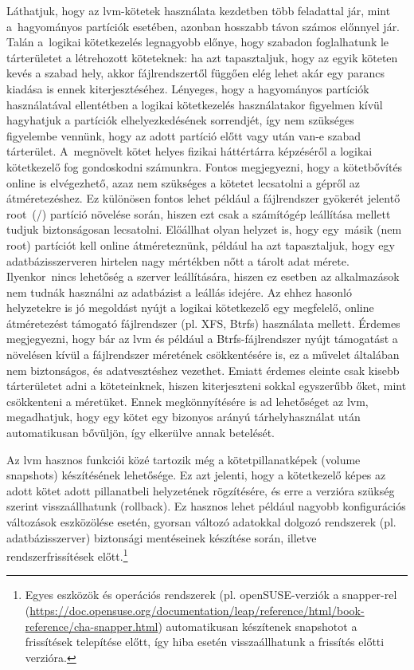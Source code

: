 Láthatjuk, hogy az \acrshort{lvm}-kötetek használata kezdetben több feladattal jár, mint a~hagyományos partíciók esetében, azonban hosszabb távon számos előnnyel jár. Talán a~logikai kötetkezelés legnagyobb előnye, hogy szabadon foglalhatunk le tárterületet a létrehozott köteteknek: ha azt tapasztaljuk, hogy az egyik köteten kevés a szabad hely, akkor fájlrendszertől függően elég lehet akár egy parancs kiadása is ennek kiterjesztéséhez. Lényeges, hogy a hagyományos partíciók használatával ellentétben a logikai kötetkezelés használatakor figyelmen kívül hagyhatjuk a partíciók elhelyezkedésének sorrendjét, így nem szükséges figyelembe vennünk, hogy az adott partíció előtt vagy után van-e szabad tárterület. A~megnövelt kötet helyes fizikai háttértárra képzéséről a logikai kötetkezelő fog gondoskodni számunkra. Fontos megjegyezni, hogy a kötetbővítés online is elvégezhető, azaz nem szükséges a kötetet lecsatolni a gépről az átméretezéshez. Ez különösen fontos lehet például a fájlrendszer gyökerét jelentő root~(/) partíció növelése során, hiszen ezt csak a számítógép leállítása mellett tudjuk biztonságosan lecsatolni. Előállhat olyan helyzet is, hogy egy~másik (nem root) partíciót kell online átméreteznünk, például ha azt tapasztaljuk, hogy egy adatbázisszerveren hirtelen nagy mértékben nőtt a tárolt adat mérete. Ilyenkor~nincs lehetőség a szerver leállítására, hiszen ez esetben az alkalmazások nem tudnák használni az adatbázist a leállás idejére. Az ehhez hasonló helyzetekre is jó megoldást nyújt a logikai kötetkezelő egy megfelelő, online átméretezést támogató fájlrendszer (pl. XFS, Btrfs) használata mellett. Érdemes megjegyezni, hogy bár az \acrshort{lvm} és például a Btrfs-fájlrendszer nyújt támogatást a növelésen kívül a fájlrendszer méretének csökkentésére is, ez a művelet általában nem biztonságos, és adatvesztéshez vezethet. Emiatt érdemes eleinte csak kisebb tárterületet adni a köteteinknek, hiszen kiterjeszteni sokkal egyszerűbb őket, mint csökkenteni a méretüket. Ennek megkönnyítésére is ad lehetőséget az \acrshort{lvm}, megadhatjuk, hogy egy kötet egy bizonyos arányú tárhelyhasználat után automatikusan bővüljön, így elkerülve annak betelését.

Az \acrshort{lvm} hasznos funkciói közé tartozik még a kötetpillanatképek (volume snapshots) készítésének lehetősége. Ez azt jelenti, hogy a kötetkezelő képes az adott kötet adott pillanatbeli helyzetének rögzítésére, és erre a verzióra szükség szerint visszaállhatunk (rollback). Ez hasznos lehet például nagyobb konfigurációs változások eszközölése esetén, gyorsan változó adatokkal dolgozó rendszerek (pl. adatbázisszerver) biztonsági mentéseinek készítése során, illetve rendszerfrissítések előtt.\footnote{Egyes eszközök és operációs rendszerek (pl. openSUSE-verziók a snapper-rel (\url{https://doc.opensuse.org/documentation/leap/reference/html/book-reference/cha-snapper.html}) automatikusan készítenek snapshotot a frissítések telepítése előtt, így hiba esetén visszaállhatunk a frissítés előtti verzióra.}

